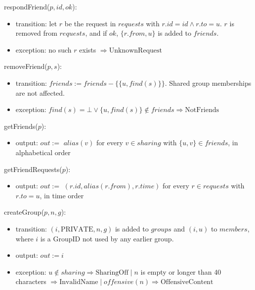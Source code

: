 \documentclass[12pt, titlepage]{article}
\begin{document}
\noindent respondFriend($p, \mathit{id}, \mathit{ok}$):
\begin{itemize}
\item transition: let $r$ be the request in $\mathit{requests}$ with
  $r.\mathit{id} = \mathit{id} \wedge r.\mathit{to} = u$. $r$ is removed from
  $\mathit{requests}$, and if $\mathit{ok}$, $\{r.\mathit{from}, u\}$ is
  added to $\mathit{friends}$.
\item exception: no such $r$ exists $\Rightarrow \mathrm{UnknownRequest}$
\end{itemize}

\noindent removeFriend($p, s$):
\begin{itemize}
\item transition: $\mathit{friends} := \mathit{friends} - \{\{u,
  \mathit{find}(s)\}\}$. Shared group memberships are not affected.
\item exception: $\mathit{find}(s) = \bot \vee \{u, \mathit{find}(s)\}
  \notin \mathit{friends} \Rightarrow \mathrm{NotFriends}$
\end{itemize}

\noindent getFriends($p$):
\begin{itemize}
\item output: $\mathit{out} :=$ $\mathit{alias}(v)$ for every $v \in
  \mathit{sharing}$ with $\{u, v\} \in \mathit{friends}$, in alphabetical
  order
\end{itemize}

\noindent getFriendRequests($p$):
\begin{itemize}
\item output: $\mathit{out} :=$ $(r.\mathit{id},
  \mathit{alias}(r.\mathit{from}), r.\mathit{time})$ for every $r \in
  \mathit{requests}$ with $r.\mathit{to} = u$, in time order
\end{itemize}

\noindent createGroup($p, n, g$):
\begin{itemize}
\item transition: $(i, \mathrm{PRIVATE}, n, g)$ is added to
  $\mathit{groups}$ and $(i, u)$ to $\mathit{members}$, where $i$ is a
  GroupID not used by any earlier group.
\item output: $\mathit{out} := i$
\item exception: $u \notin \mathit{sharing} \Rightarrow \mathrm{SharingOff}
  \mid n$ is empty or longer than 40 characters $\Rightarrow
  \mathrm{InvalidName} \mid \mathit{offensive}(n) \Rightarrow
  \mathrm{OffensiveContent}$
\end{itemize}
\end{document}
